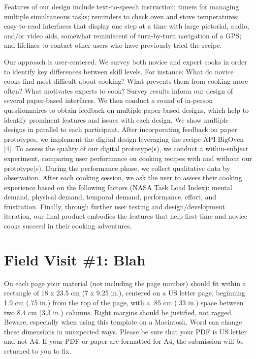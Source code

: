 \documentclass{sigchi}
\begin{document}
Features of our design include text-to-speech instruction; timers for managing multiple simultaneous tasks; reminders to check oven and stove temperatures; easy-to-read interfaces that display one step at a time with large pictorial, audio, and/or video aids, somewhat reminiscent of turn-by-turn navigation of a GPS; and lifelines to contact other users who have previously tried the recipe.

Our approach is user-centered. We survey both novice and expert cooks in order to identify key differences between skill levels. For instance: What do novice cooks find most difficult about cooking? What prevents them from cooking more often? What motivates experts to cook? Survey results inform our design of several paper-based interfaces. We then conduct a round of in-person questionnaires to obtain feedback on multiple paper-based designs, which help to identify prominent features and issues with each design. We show multiple designs in parallel to each participant. After incorporating feedback on paper prototypes, we implement the digital design leveraging the recipe API BigOven [4]. To assess the quality of our digital prototype(s), we conduct a within-subject experiment, comparing user performance on cooking recipes with and without our prototype(s). During the performance phase, we collect qualitative data by observation. After each cooking session, we ask the user to assess their cooking experience based on the following factors (NASA Task Load Index): mental demand, physical demand, temporal demand, performance, effort, and frustration. Finally, through further user testing and design/development iteration, our final product embodies the features that help first-time and novice cooks succeed in their cooking adventures.

\section{Field Visit \#1: Blah}

On each page your material (not including the page number) should fit
within a rectangle of 18 x 23.5 cm (7 x 9.25 in.), centered on a US
letter page, beginning 1.9 cm (.75 in.) from the top of the page, with
a .85 cm (.33 in.) space between two 8.4 cm (3.3 in.) columns.  Right
margins should be justified, not ragged. Beware, especially when using
this template on a Macintosh, Word can change these dimensions in
unexpected ways. Please be sure that your PDF is US letter and not
A4. If your PDF or paper are formatted for A4, the submission will be
returned to you to fix.
\end{document}
